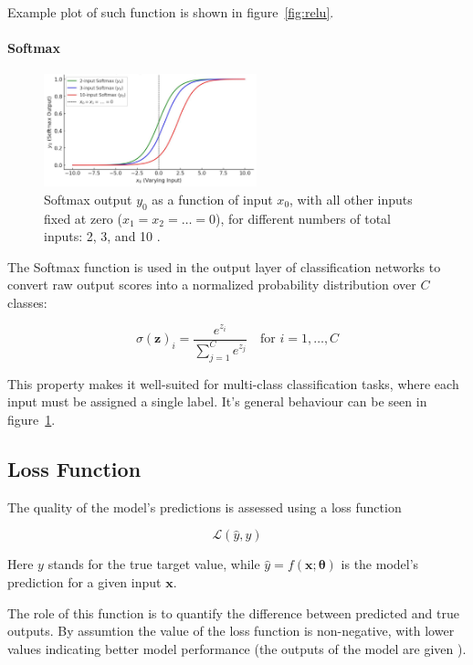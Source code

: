 \documentclass{pracalicmgr}
\begin{document}
Example plot of such function is shown in figure~\ref{fig:relu}.

\paragraph{Softmax}

\begin{figure}[H]
\centering
\includegraphics[width=0.55\textwidth]{src/softmax.pdf}
\caption{Softmax output $y_0$ as a function of input $x_0$, with all other inputs fixed at zero ($x_1 = x_2 = \ldots = 0$), for different numbers of total inputs: 2, 3, and 10 \cite{softmaxRef}.}
\label{fig:softmax}
\end{figure}

The Softmax function is used in the output layer of classification networks to convert raw output scores into a normalized probability distribution over \( C \) classes:

\[
\sigma(\mathbf{z})_i = \frac{e^{z_i}}{\sum_{j=1}^{C} e^{z_j}} \quad \text{for } i = 1, \dots, C
\]

This property makes it well-suited for multi-class classification tasks, where each input must be assigned a single label. It's general behaviour can be seen in figure~\ref{fig:softmax}.

\subsection{Loss Function}

The quality of the model's predictions is assessed using a loss function 

\[
\mathcal{L}(\hat{y}, y)
\]

Here $y$ stands for the true target value, while \( \hat{y} = f(\mathbf{x}; \boldsymbol{\theta}) \) is the model's prediction for a given input \( \mathbf{x} \).

The role of this function is to quantify the difference between predicted and true outputs. By assumtion the value of the loss function is non-negative, with lower values indicating better model performance (the outputs of the model are given ).
\end{document}
